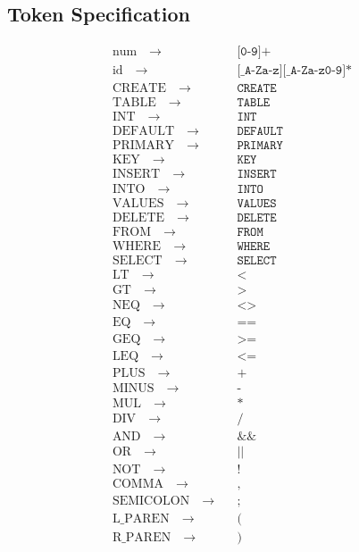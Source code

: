 \documentclass{article}
\begin{document}
\subsection {Token Specification}
\begin{align*}
\text{num}\quad\to\quad & \texttt{[0-9]+} \\
\text{id}\quad\to\quad & \texttt{[\_A-Za-z][\_A-Za-z0-9]*} \\
\text{CREATE}\quad\to\quad & \texttt{CREATE} \\
\text{TABLE}\quad\to\quad & \texttt{TABLE} \\
\text{INT}\quad\to\quad & \texttt{INT} \\
\text{DEFAULT}\quad\to\quad & \texttt{DEFAULT} \\
\text{PRIMARY}\quad\to\quad & \texttt{PRIMARY} \\
\text{KEY}\quad\to\quad & \texttt{KEY} \\
\text{INSERT}\quad\to\quad & \texttt{INSERT} \\
\text{INTO}\quad\to\quad & \texttt{INTO} \\
\text{VALUES}\quad\to\quad & \texttt{VALUES} \\
\text{DELETE}\quad\to\quad & \texttt{DELETE} \\
\text{FROM}\quad\to\quad & \texttt{FROM} \\
\text{WHERE}\quad\to\quad & \texttt{WHERE} \\
\text{SELECT}\quad\to\quad & \texttt{SELECT} \\
\text{LT}\quad\to\quad & \texttt{<} \\
\text{GT}\quad\to\quad & \texttt{>} \\
\text{NEQ}\quad\to\quad & \texttt{<>} \\
\text{EQ}\quad\to\quad & \texttt{==} \\
\text{GEQ}\quad\to\quad & \texttt{>=} \\
\text{LEQ}\quad\to\quad & \texttt{<=} \\
\text{PLUS}\quad\to\quad & \texttt{+} \\
\text{MINUS}\quad\to\quad & \texttt{-} \\
\text{MUL}\quad\to\quad & \texttt{*} \\
\text{DIV}\quad\to\quad & \texttt{/} \\
\text{AND}\quad\to\quad & \texttt{\&\&} \\
\text{OR}\quad\to\quad & \texttt{||} \\
\text{NOT}\quad\to\quad & \texttt{!} \\
\text{COMMA}\quad\to\quad & \texttt{,} \\
\text{SEMICOLON}\quad\to\quad & \texttt{;} \\
\text{L\_PAREN}\quad\to\quad & \texttt{(} \\
\text{R\_PAREN}\quad\to\quad & \texttt{)}
\end{align*}
\end{document}
